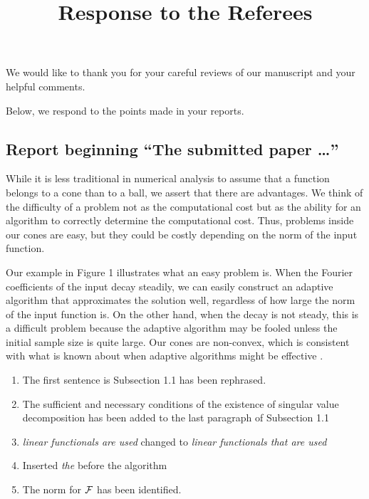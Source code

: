 \documentclass[letter]{article}
\begin{document}
\title{Response to the Referees}
\maketitle

\noindent We would like to thank you for your careful reviews of our manuscript and your helpful comments. 

\noindent Below, we respond to the points made in your reports.

\subsection*{Report beginning ``The submitted paper \ldots''}

While it is less traditional in numerical analysis to assume that a function belongs to a cone than to a ball, we assert that there are advantages.  We think of the difficulty of a problem not as the computational cost but as the ability for an algorithm to correctly determine the computational cost. Thus, problems inside our cones are easy, but they could be costly depending on the norm of the input function.  

Our example in Figure 1 illustrates what an easy problem is.  When the Fourier coefficients of the input decay steadily, we can easily construct an adaptive algorithm that approximates the solution well, regardless of how large the norm of the input function is.  On the other hand, when the decay is not steady, this is a difficult problem because the adaptive algorithm may be fooled unless the initial sample size is quite large.  Our cones are non-convex, which is consistent with what is known about when adaptive algorithms might be effective \cite{Bak71}.

\begin{enumerate}
    \item The first sentence is Subsection 1.1 has been rephrased.
    \item The sufficient and necessary conditions of the existence of singular value decomposition has been added  to  the last paragraph of Subsection 1.1
    \item \textit{linear functionals are used} changed to 
    \textit{linear functionals that are used}
    \item Inserted \textit{the} before the algorithm
    \item The norm for ${\mathcal{F}}$ has been identified.
\end{enumerate}
\end{document}
